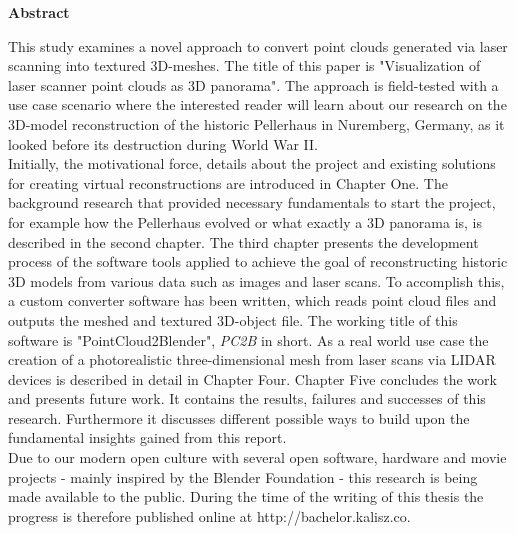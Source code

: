 \thispagestyle{plain}
\begin{center}
	
	\LARGE
	\textbf{Abstract}
	
\end{center}
\vspace{100pt}

This study examines a novel approach to convert point clouds generated via laser scanning into textured 3D-meshes. The title of this paper is "Visualization of laser scanner point clouds as 3D panorama".
The approach is field-tested with a use case scenario where the interested reader will learn about our research on the 3D-model reconstruction of the historic Pellerhaus in Nuremberg, Germany, as it looked before its destruction during World War II.\\

Initially, the motivational force, details about the project and existing solutions for creating virtual reconstructions are introduced in Chapter One.
The background research that provided necessary fundamentals to start the project, for example how the Pellerhaus evolved or what exactly a 3D panorama is, is described in the second chapter.
The third chapter presents the development process of the software tools applied to achieve the goal of reconstructing historic 3D models from various data such as images and laser scans. To accomplish this, a custom converter software has been written, which reads point cloud files and outputs the meshed and textured 3D-object file. The working title of this software is "PointCloud2Blender", \textit{PC2B} in short.
As a real world use case the creation of a photorealistic three-dimensional mesh from laser scans via LIDAR devices is described in detail in Chapter Four.
Chapter Five concludes the work and presents future work. It contains the results, failures and successes of this research. Furthermore it discusses different possible ways to build upon the fundamental insights gained from this report.\\

Due to our modern open culture with several open software, hardware and movie projects - mainly inspired by the Blender Foundation - this research is being made available to the public. During the time of the writing of this thesis the progress is therefore published online at http://bachelor.kalisz.co.
